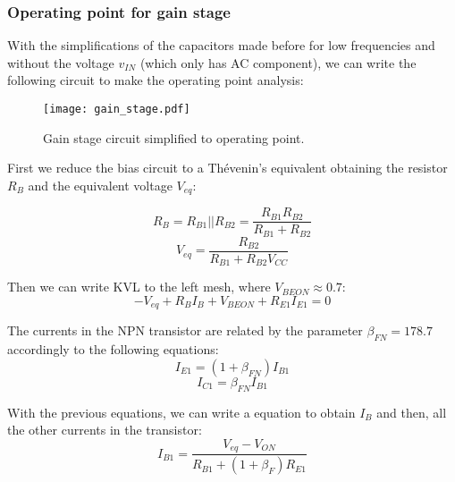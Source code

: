 \subsubsection{Operating point for gain stage}
\label{subsec:OP1}

\par With the simplifications of the capacitors made before for low frequencies and without the voltage $v_{IN}$ (which only has AC component), we can write the following circuit to make the operating point analysis:

\begin{figure}[H] \centering
\texttt{[image: gain\_stage.pdf]}
\caption{Gain stage circuit simplified to operating point.}
\label{fig:gain_stage}
\end{figure}

\par First we reduce the bias circuit to a Thévenin's equivalent obtaining the resistor $R_B$ and the equivalent voltage $V_{eq}$:

\begin{equation}
R_B=R_{B1}||R_{B2}=\frac{R_{B1}R_{B2}}{R_{B1}+R_{B2}}
\end{equation}
\begin{equation}
V_{eq}=\frac{R_{B2}}{R_{B1}+R_{B2}V_{CC}}
\end{equation}

\par Then we can write KVL to the left mesh, where $V_{BEON}\approx 0.7$:
\begin{equation}
-V_{eq}+R_BI_B+V_{BEON}+R_{E1}I_{E1}=0
\end{equation}
\par The currents in the NPN transistor are related by the parameter $\beta _{FN}=178.7$ accordingly to the following equations:
\begin{equation}
I_{E1}=(1+\beta _{FN})I_{B1}
\end{equation}
\begin{equation}
I_{C1}=\beta _{FN}I_{B1}
\end{equation}

\par With the previous equations, we can write a equation to obtain $I_B$ and then, all the other currents in the transistor:
\begin{equation}
I_{B1}=\frac{V_{eq}-V_{ON}}{R_{B1}+(1+\beta _F)R_{E1}}
\end{equation}

